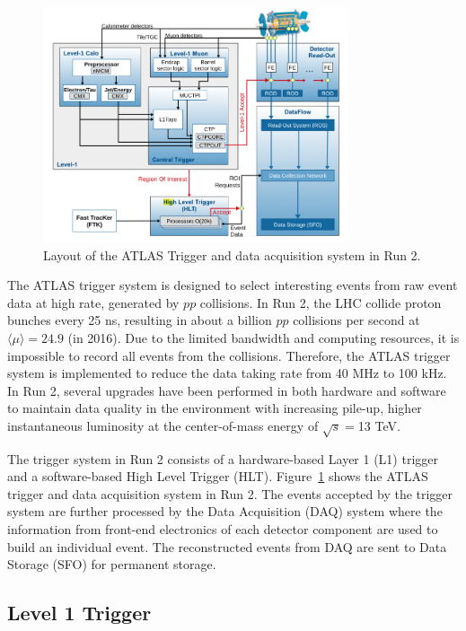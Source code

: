 \begin{figure}[!htb]
    \includegraphics[width=0.8\textwidth]{figures/tdaq.png}
    \centering
    \caption{Layout of the ATLAS Trigger and data acquisition system in Run 2.}
    \label{fig:tdaq}
\end{figure}

The ATLAS trigger system is designed to select interesting events from raw event data at high rate, generated by $pp$ collisions. In Run 2, the LHC collide proton bunches every 25 \si{\nano\second}, resulting in about a billion $pp$ collisions per second at $\langle\mu\rangle = 24.9$ (in 2016). Due to the limited bandwidth and computing resources, it is impossible to record all events from the collisions. Therefore, the ATLAS trigger system is implemented to reduce the data taking rate from 40 \si{\mega\hertz} to 100 \si{\kilo\hertz}. In Run 2, several upgrades have been performed in both hardware and software to maintain data quality in the environment with increasing pile-up, higher instantaneous luminosity at the center-of-mass energy of $\sqrt{s}=$13 TeV.

The trigger system in Run 2 consists of a hardware-based Layer 1 (L1) trigger and a software-based High Level Trigger (HLT). Figure~\ref{fig:tdaq} shows the ATLAS trigger and data acquisition system in Run 2. The events accepted by the trigger system are further processed by the Data Acquisition (DAQ) system where the information from front-end electronics of each detector component are used to build an individual event. The reconstructed events from DAQ are sent to Data Storage (SFO) for permanent storage.



\subsection{Level 1 Trigger}
\label{sec:atlas:l1trigger}


